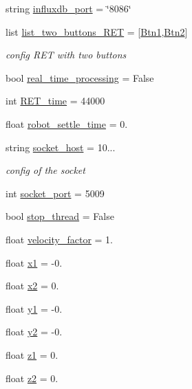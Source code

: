 \begin{DoxyCompactItemize}
string \hyperlink{a00025_a91cab5b28cd6867b74e2cb9f887b2948}{influxdb\+\_\+port} = \char`\"{}8086\char`\"{}
\item 
list \hyperlink{a00025_aceb7d96541943b4a77c54516a2be88d2}{list\+\_\+two\+\_\+buttons\+\_\+\+R\+ET} = \mbox{[}\hyperlink{a00025_af037c6b9ff0314103d8127acc9d07e0b}{Btn1},\hyperlink{a00025_a73afa8c52cebd94e1889df5fbe3bec66}{Btn2}\mbox{]}
\begin{DoxyCompactList}\small\item\em config R\+ET with two buttons \end{DoxyCompactList}\item 
bool \hyperlink{a00025_a4132cf21a6c01ecf59141756ab5f9936}{real\+\_\+time\+\_\+processing} = False
\item 
int \hyperlink{a00025_a262169df063120aeead2e82d4cdb440c}{R\+E\+T\+\_\+time} = 44000
\item 
float \hyperlink{a00025_aff247d8ee094bb439dbb098e236455cb}{robot\+\_\+settle\+\_\+time} = 0.
\item 
string \hyperlink{a00025_a2014ea8569b3cda02e44e85f8840eba2}{socket\+\_\+host} = \textquotesingle{}10...\textquotesingle{}
\begin{DoxyCompactList}\small\item\em config of the socket \end{DoxyCompactList}\item 
int \hyperlink{a00025_a08c4648fe1aa34a4fd5ad0097d17237f}{socket\+\_\+port} = 5009
\item 
bool \hyperlink{a00025_a94d742b756b055a53df310fd15705ede}{stop\+\_\+thread} = False
\item 
float \hyperlink{a00025_a0fee7ae942bb4b6078c6400331aef6f1}{velocity\+\_\+factor} = 1.
\item 
float \hyperlink{a00025_a3389d8b95846602e8f94cc15f41e48e9}{x1} = -\/0.
\item 
float \hyperlink{a00025_a24d6ffb6e8780eef0c81cd97e3f4fdaf}{x2} = 0.
\item 
float \hyperlink{a00025_a9fe80bf4738047a31d7c162807ed85f0}{y1} = -\/0.
\item 
float \hyperlink{a00025_a07bcd014e69eddcf4243b2a961014eaf}{y2} = -\/0.
\item 
float \hyperlink{a00025_a7da4886c0a2e03b8bb9ed62eb20efb78}{z1} = 0.
\item 
float \hyperlink{a00025_a55196b87940893e540ba636218f4eb07}{z2} = 0.
\end{DoxyCompactItemize}


